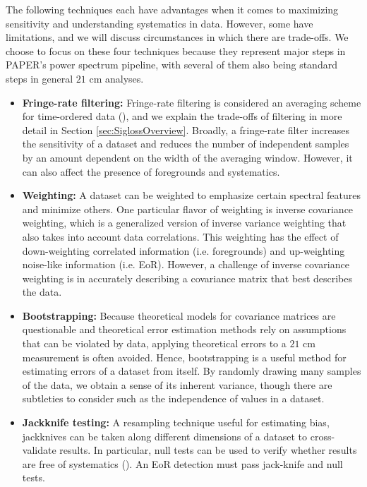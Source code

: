 \documentclass[preprint2,numberedappendix,tighten]{aastex6}  %
\begin{document}
The following techniques each have advantages when it comes to maximizing sensitivity and understanding systematics in data. However, some have limitations, and we will discuss circumstances in which there are trade-offs. We choose to focus on these four techniques because they represent major steps in PAPER's power spectrum pipeline, with several of them also being standard steps in general $21$ cm analyses.
\begin{itemize}
\item \textbf{Fringe-rate filtering:} Fringe-rate filtering is considered an averaging scheme for time-ordered data (\citealt{parsons_et_al2016}), and we explain the trade-offs of filtering in more detail in Section \ref{sec:SiglossOverview}. Broadly, a fringe-rate filter increases the sensitivity of a dataset and reduces the number of independent samples by an amount dependent on the width of the averaging window. However, it can also affect the presence of foregrounds and systematics. 
\item \textbf{Weighting:} A dataset can be weighted to emphasize certain spectral features and minimize others. One particular flavor of weighting is inverse covariance weighting, which is a generalized version of inverse variance weighting that also takes into account data correlations. This weighting has the effect of down-weighting correlated information (i.e. foregrounds) and up-weighting noise-like information (i.e. EoR). However, a challenge of inverse covariance weighting is in accurately describing a covariance matrix that best describes the data. 
\item \textbf{Bootstrapping:} Because theoretical models for covariance matrices are questionable and theoretical error estimation methods rely on assumptions that can be violated by data, applying theoretical errors to a $21$ cm measurement is often avoided. Hence, bootstrapping is a useful method for estimating errors of a dataset from itself. By randomly drawing many samples of the data, we obtain a sense of its inherent variance, though there are subtleties to consider such as the independence of values in a dataset.
\item \textbf{Jackknife testing:} A resampling technique useful for estimating bias, jackknives can be taken along different dimensions of a dataset to cross-validate results. In particular, null tests can be used to verify whether results are free of systematics (\citealt{keating_et_al2016}). An EoR detection must pass jack-knife and null tests.
\end{itemize}
\end{document}
